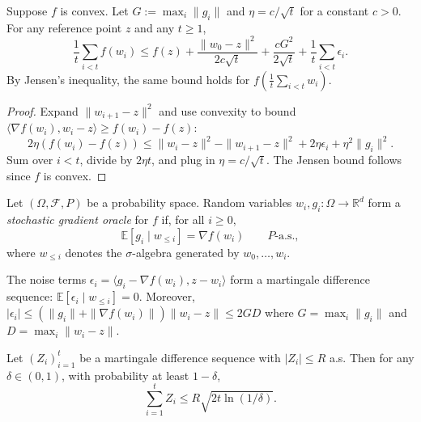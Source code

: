 \begin{lemma}\label{lem:approxGDConvergence}
  \leanok
Suppose $f$ is convex.
Let $G := \max_i \|g_i\|$ and $\eta = c/\sqrt{t}$ for a constant $c > 0$.
For any reference point $z$ and any $t \ge 1$,
\[
  \frac{1}{t}\sum_{i<t} f(w_i)
  \le f(z) + \frac{\|w_0 - z\|^2}{2c\sqrt{t}} + \frac{cG^2}{2\sqrt{t}} + \frac{1}{t}\sum_{i<t}\epsilon_i.
\]
By Jensen's inequality, the same bound holds for $f\!\left(\frac{1}{t}\sum_{i<t} w_i\right)$.
\end{lemma}

\begin{proof}
Expand $\|w_{i+1} - z\|^2$ and use convexity to bound $\langle \nabla f(w_i), w_i - z\rangle \ge f(w_i) - f(z)$:
\[
  2\eta(f(w_i) - f(z)) \le \|w_i - z\|^2 - \|w_{i+1} - z\|^2 + 2\eta\epsilon_i + \eta^2\|g_i\|^2.
\]
Sum over $i < t$, divide by $2\eta t$, and plug in $\eta = c/\sqrt{t}$.
The Jensen bound follows since $f$ is convex.
\end{proof}

\begin{definition}\label{def:sgdOracle}
  \leanok
Let $(\Omega, \mathcal{F}, P)$ be a probability space.
Random variables $w_i, g_i : \Omega \to \mathbb{R}^d$ form a \emph{stochastic gradient oracle} for $f$ if, for all $i \ge 0$,
\[
  \mathbb{E}[g_i \mid w_{\le i}] = \nabla f(w_i) \qquad P\text{-a.s.},
\]
where $w_{\le i}$ denotes the $\sigma$-algebra generated by $w_0, \ldots, w_i$.
\end{definition}

\begin{remark}
The noise terms $\epsilon_i = \langle g_i - \nabla f(w_i), z - w_i\rangle$ form a martingale difference sequence: $\mathbb{E}[\epsilon_i \mid w_{\le i}] = 0$.
Moreover, $|\epsilon_i| \le (\|g_i\| + \|\nabla f(w_i)\|)\|w_i - z\| \le 2GD$ where $G = \max_i \|g_i\|$ and $D = \max_i \|w_i - z\|$.
\end{remark}

\begin{theorem}\label{thm:azumaHoeffding}
  \mathlibok
Let $(Z_i)_{i=1}^t$ be a martingale difference sequence with $|Z_i| \le R$ a.s.
Then for any $\delta \in (0,1)$, with probability at least $1 - \delta$,
\[
  \sum_{i=1}^t Z_i \le R\sqrt{2t \ln(1/\delta)}.
\]
\end{theorem}

